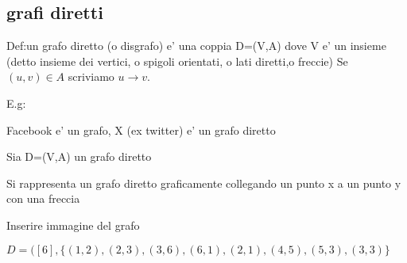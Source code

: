 \documentclass{article}
\begin{document}
        \subsection{grafi diretti}
        \begin{flushleft}
          Def:un grafo diretto (o disgrafo) e' una coppia D=(V,A) dove V e' un insieme (detto insieme dei vertici, o spigoli orientati, o lati diretti,o freccie)
          Se $(u,v)\in A$ scriviamo $u \to v$.
        \end{flushleft}
        E.g:
        \begin{flushleft}
          Facebook e' un grafo, X (ex twitter) e' un grafo diretto
        \end{flushleft}
        \begin{flushleft}
          Sia D=(V,A) un grafo diretto
        \end{flushleft}
        \begin{flushleft}
          Si rappresenta un grafo diretto graficamente collegando un punto x a un punto y con una freccia
        \end{flushleft}
        \begin{flushleft}
          Inserire immagine del grafo
        \end{flushleft}
        \begin{flushleft}
          $D=([6],\{ (1,2),(2,3),(3,6),(6,1),(2,1),(4,5),(5,3),(3,3)\}$
        \end{flushleft}
\end{document}
